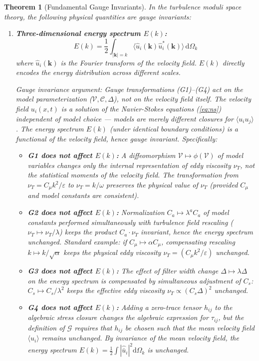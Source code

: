 \documentclass[12pt,a4paper]{article}
\theoremstyle{plain}
\newtheorem{theorem}{Theorem}[section]
\theoremstyle{definition}
\theoremstyle{remark}
\newcommand{\G}{\mathcal{G}}
\newcommand{\eps}{\varepsilon}
\newcommand{\diff}{\mathrm{d}}
\newcommand{\avg}[1]{\langle #1 \rangle}
\begin{document}
\begin{theorem}[Fundamental Gauge Invariants]\label{thm:invariants}
In the turbulence moduli space theory, the following physical quantities are gauge invariants:

\begin{enumerate}[label=\textbf{(\arabic*)}]
    \item \textbf{Three-dimensional energy spectrum $E(k)$:}
    \begin{equation}
    E(k) = \frac{1}{2}\int_{|\mathbf{k}|=k} \avg{\hat{u}_i(\mathbf{k})\hat{u}_i^*(\mathbf{k})}\,\diff\Omega_k
    \end{equation}
    where $\hat{u}_i(\mathbf{k})$ is the Fourier transform of the velocity field. $E(k)$ directly encodes the energy distribution across different scales.

    Gauge invariance argument: Gauge transformations (G1)--(G4) act on the model parameterization ($\mathcal{V},\mathcal{C},\Delta$), not on the velocity field itself. The velocity field $u_i(x,t)$ is a solution of the Navier-Stokes equations (\ref{eq:ns}) independent of model choice --- models are merely different closures for $\avg{u_i u_j}$. The energy spectrum $E(k)$ (under identical boundary conditions) is a functional of the velocity field, hence gauge invariant. Specifically:
    \begin{itemize}
        \item \textbf{G1 does not affect $E(k)$:} A diffeomorphism $\mathcal{V}\mapsto\phi(\mathcal{V})$ of model variables changes only the internal representation of eddy viscosity $\nu_T$, not the statistical moments of the velocity field. The transformation from $\nu_T = C_\mu k^2/\eps$ to $\nu_T = k/\omega$ preserves the physical value of $\nu_T$ (provided $C_\mu$ and model constants are consistent).
        \item \textbf{G2 does not affect $E(k)$:} Normalization $C_a\mapsto\lambda^a C_a$ of model constants performed simultaneously with turbulence field rescaling ($\nu_T\mapsto\nu_T/\lambda$) keeps the product $C_a\cdot\nu_T$ invariant, hence the energy spectrum unchanged. Standard example: if $C_\mu\mapsto\alpha C_\mu$, compensating rescaling $k\mapsto k/\sqrt{\alpha}$ keeps the physical eddy viscosity $\nu_T = (C_\mu k^2/\eps)$ unchanged.
        \item \textbf{G3 does not affect $E(k)$:} The effect of filter width change $\Delta\mapsto\lambda\Delta$ on the energy spectrum is compensated by simultaneous adjustment of $C_s$: $C_s\mapsto C_s/\lambda^2$ keeps the effective eddy viscosity $\nu_T\propto(C_s\Delta)^2$ unchanged.
        \item \textbf{G4 does not affect $E(k)$:} Adding a zero-trace tensor $h_{ij}$ to the algebraic stress closure changes the algebraic expression for $\tau_{ij}$, but the definition of $\G$ requires that $h_{ij}$ be chosen such that the mean velocity field $\avg{u_i}$ remains unchanged. By invariance of the mean velocity field, the energy spectrum $E(k) = \frac{1}{2}\int|\hat{\bar{u}}_i|^2\diff\Omega_k$ is unchanged.
    \end{itemize}

\end{enumerate}
\end{theorem}
\end{document}
